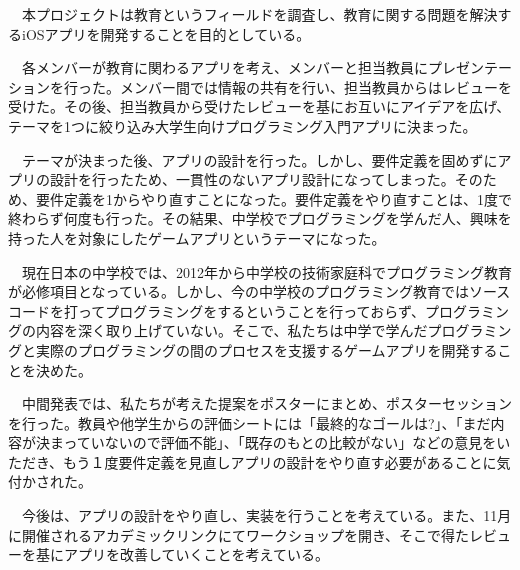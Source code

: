 \documentclass[openany,11pt,papersize]{jsbook}
\newcounter{hoge}
\newcommand{\fake}[1]{\whiledo{\thehoge<70}{#1\stepcounter{hoge}}%
  \setcounter{hoge}{0}}
\begin{document}
%
\maketitle

\frontmatter

\begin{jabstract} 
　本プロジェクトは教育というフィールドを調査し、教育に関する問題を解決するiOSアプリを開発することを目的としている。

　各メンバーが教育に関わるアプリを考え、メンバーと担当教員にプレゼンテーションを行った。メンバー間では情報の共有を行い、担当教員からはレビューを受けた。その後、担当教員から受けたレビューを基にお互いにアイデアを広げ、テーマを1つに絞り込み大学生向けプログラミング入門アプリに決まった。

　テーマが決まった後、アプリの設計を行った。しかし、要件定義を固めずにアプリの設計を行ったため、一貫性のないアプリ設計になってしまった。そのため、要件定義を1からやり直すことになった。要件定義をやり直すことは、1度で終わらず何度も行った。その結果、中学校でプログラミングを学んだ人、興味を持った人を対象にしたゲームアプリというテーマになった。

　現在日本の中学校では、2012年から中学校の技術家庭科でプログラミング教育が必修項目となっている。しかし、今の中学校のプログラミング教育ではソースコードを打ってプログラミングをするということを行っておらず、プログラミングの内容を深く取り上げていない。そこで、私たちは中学で学んだプログラミングと実際のプログラミングの間のプロセスを支援するゲームアプリを開発することを決めた。

　中間発表では、私たちが考えた提案をポスターにまとめ、ポスターセッションを行った。教員や他学生からの評価シートには「最終的なゴールは?」、「まだ内容が決まっていないので評価不能」、「既存のもとの比較がない」などの意見をいただき、もう１度要件定義を見直しアプリの設計をやり直す必要があることに気付かされた。

　今後は、アプリの設計をやり直し、実装を行うことを考えている。また、11月に開催されるアカデミックリンクにてワークショップを開き、そこで得たレビューを基にアプリを改善していくことを考えている。

\end{jabstract}
\end{document}
